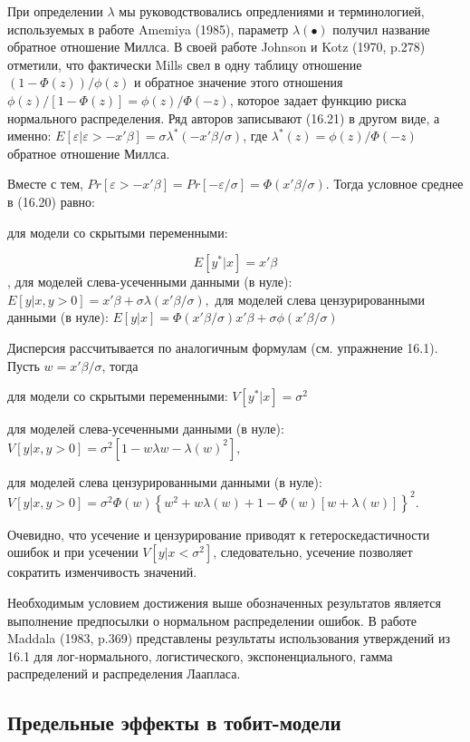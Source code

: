 При определении $\lambda$ мы руководствовались опредлениями и терминологией, используемых в работе Amemiya (1985), параметр $\lambda(\bullet)$ получил название обратное отношение Миллса. В своей работе Johnson и Kotz (1970, p.278) отметили, что фактически Mills свел в одну таблицу отношение $(1-\Phi(z))/\phi(z)$ и обратное значение этого отношения $\phi(z)/[1-\Phi(z)]=\phi(z)/\Phi(-z)$, которое задает функцию риска нормального распределения. Ряд авторов записывают (16.21) в другом виде, а именно: $E[\varepsilon|\varepsilon>-x'\beta]=\sigma\lambda^{*}(-x'\beta/\sigma)$, где $\lambda^{*}(z)=\phi(z)/\Phi(-z)$ обратное отношение Миллса.

Вместе с тем, $Pr[\varepsilon>-x'\beta]=Pr[-\varepsilon/\sigma]=\Phi(x'\beta/\sigma)$. Тогда условное среднее в (16.20) равно:

для модели со скрытыми переменными: 

\begin{equation}
E[y^{*}|x]=x'\beta
\end{equation},
для моделей слева-усеченными данными (в нуле): $E[y|x,y>0]=x'\beta+\sigma\lambda(x'\beta/\sigma),$
для моделей слева цензурированными данными (в нуле): $E[y|x]=\Phi(x'\beta/\sigma)x'\beta+\sigma\phi(x'\beta/\sigma)$

Дисперсия рассчитывается по аналогичным формулам (см. упражнение 16.1). Пусть $w=x'\beta/\sigma$, тогда 

для модели со скрытыми переменными: $V[y^{*}|x]=\sigma^2$

для моделей слева-усеченными данными (в нуле): $V[y|x,y>0]=\sigma^2[1-w\lambda{w}-\lambda(w)^2],$

для моделей слева цензурированными данными (в нуле): $V[y|x,y>0]={\sigma}^2\Phi(w)\left\lbrace  w^2+w\lambda(w)+1-\Phi(w)[w+\lambda(w)]\right\rbrace^2$.

Очевидно, что усечение и цензурирование приводят к гетероскедастичности ошибок и при усечении $V[y|x<\sigma^2]$, следовательно, усечение позволяет сократить изменчивость значений.

Необходимым условием достижения выше обозначенных результатов является выполнение предпосылки о нормальном распределении ошибок. В работе Maddala (1983, p.369) представлены результаты использования утверждений из 16.1 для лог-нормального, логистического, экспоненциального, гамма распределений и распределения Лаапласа.

\subsection{Предельные эффекты в тобит-модели}

